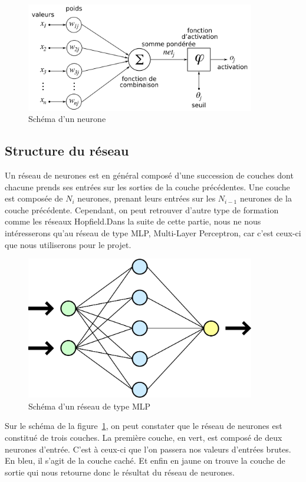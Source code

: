 \documentclass[11pt]{report}
\begin{document}
\begin{figure}[htbp]
\centering
\includegraphics[width=10cm]{perceptron.png}
\caption{Schéma d'un neurone}
\end{figure}

\subsection{Structure du réseau}

Un réseau de neurones est en général composé d'une succession de couches dont chacune prends ses entrées sur les sorties de la couche précédentes. Une couche est composée de $N_{i}$ neurones, prenant leurs entrées sur les $N_{i-1}$ neurones de la couche précédente. Cependant, on peut retrouver d'autre type de formation comme les réseaux Hopfield.Dans la suite de cette partie, nous ne nous intéresserons qu'au réseau de type MLP, Multi-Layer Perceptron, car c'est ceux-ci que nous utiliserons pour le projet.

\begin{figure}[htbp]
\centering
\includegraphics[width=10cm]{mlp.png}
\caption{Schéma d'un réseau de type MLP}
\label{MLP}
\end{figure}

Sur le schéma de la figure~\ref{MLP}, on peut constater que le réseau de neurones est constitué de trois couches. La première couche, en vert, est composé de deux neurones d'entrée. C'est à ceux-ci que l'on passera nos valeurs d'entrées brutes. En bleu, il s'agit de la couche caché. Et enfin en jaune on trouve la couche de sortie qui nous retourne donc le résultat du réseau de neurones.
\end{document}
